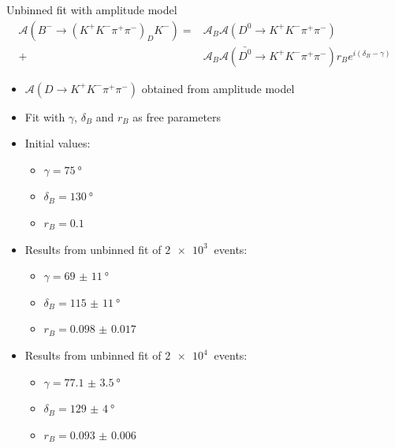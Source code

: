 \documentclass{beamer}
\begin{document}
\begin{frame}{Unbinned fit with amplitude model}
  \vspace{-0.3cm}
  \begin{align*}
    \mathcal{A}(B^-\to(K^+K^-\pi^+\pi^-)_DK^-) =& \mathcal{A}_B\mathcal{A}(D^0\to K^+K^-\pi^+\pi^-) \\
  +& \mathcal{A}_B\mathcal{A}(\bar{D^0}\to K^+K^-\pi^+\pi^-)r_Be^{i(\delta_B - \gamma)}
  \end{align*}
  \vspace{-0.5cm}
  \begin{itemize}
    \item{$\mathcal{A}(D\to K^+K^-\pi^+\pi^-)$ obtained from amplitude model}
    \item{Fit with $\gamma$, $\delta_B$ and $r_B$ as free parameters}
    \item{Initial values:}
    \begin{itemize}
      \item{$\gamma = \SI{75}{\degree}$}
      \item{$\delta_B = \SI{130}{\degree}$}
      \item{$r_B = \SI{0.1}{}$}
    \end{itemize}
    \item{Results from unbinned fit of $\SI{2e3}{}$ events:}
    \begin{itemize}
      \item{$\gamma = \SI{69(11)}{\degree}$}
      \item{$\delta_B = \SI{115(11)}{\degree}$}
      \item{$r_B = \SI{0.098(17)}{}$}
    \end{itemize}
    \item{Results from unbinned fit of $\SI{2e4}{}$ events:}
    \begin{itemize}
      \item{$\gamma = \SI{77.1(35)}{\degree}$}
      \item{$\delta_B = \SI{129(4)}{\degree}$}
      \item{$r_B = \SI{0.093(6)}{}$}
    \end{itemize}
  \end{itemize}
\end{frame}
\end{document}
